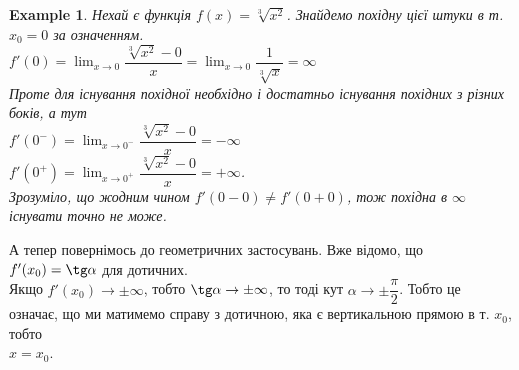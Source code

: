 \documentclass[a4paper, 14pt]{article}
\def\huge{\displaystyle}
\theoremstyle{theoremdd}
\theoremstyle{theoremdd}
\theoremstyle{theoremdd}
\theoremstyle{theoremdd}
\newtheorem{example}[theorem]{Example}
\theoremstyle{theoremdd}
\theoremstyle{theoremdd}
\theoremstyle{theoremdd}
\theoremstyle{theoremdd}
\begin{document}
\begin{example}
Нехай є функція $f(x) = \sqrt[3]{x^2}$. Знайдемо похідну цієї штуки в т. $x_0 = 0$ за означенням.\\
$f'(0) = \huge \lim_{x \to 0} \dfrac{\sqrt[3]{x^2} - 0}{x} = \lim_{x \to 0} \dfrac{1}{\sqrt[3]{x}} = \infty$\\
Проте для існування похідної необхідно і достатньо існування похідних з різних боків, а тут\\
$f'(0^-) = \huge \lim_{x \to 0^-} \dfrac{\sqrt[3]{x^2} - 0}{x} = -\infty$\\
$f'(0^+) = \huge \lim_{x \to 0^+} \dfrac{\sqrt[3]{x^2} - 0}{x} = +\infty$.\\
Зрозуміло, що жодним чином $f'(0-0) \neq f'(0+0)$, тож похідна в $\infty$ існувати точно не може.
\begin{figure}[H]
\centering
{
}
\end{figure}
\end{example}

А тепер повернімось до геометричних застосувань. Вже відомо, що $f'(x_0) = \tg \alpha$ для дотичних.\\
Якщо $f'(x_0) \to \pm \infty$, тобто $\tg \alpha \to \pm \infty$, то тоді кут $\alpha \to \pm \dfrac{\pi}{2}$. Тобто це означає, що ми матимемо справу з дотичною, яка є вертикальною прямою в т. $x_0$, тобто\\
$x=x_0$.
\end{document}
